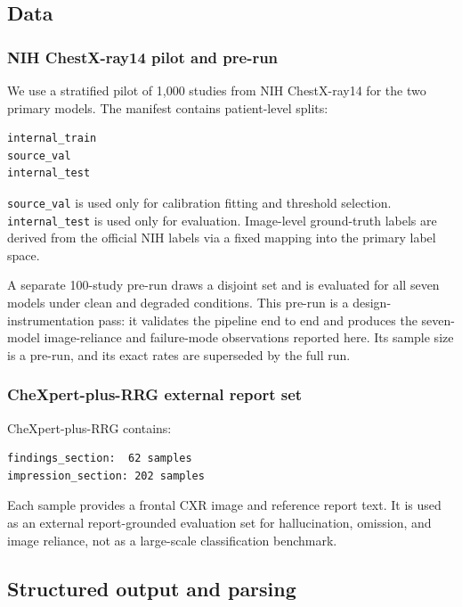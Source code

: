 \subsection{Data}

\subsubsection{NIH ChestX-ray14 pilot and pre-run}

We use a stratified pilot of 1,000 studies from NIH ChestX-ray14 for the two primary models. The manifest contains patient-level splits:

\begin{verbatim}
internal_train
source_val
internal_test
\end{verbatim}

\texttt{source\_val} is used only for calibration fitting and threshold selection. \texttt{internal\_test} is used only for evaluation. Image-level ground-truth labels are derived from the official NIH labels via a fixed mapping into the primary label space.

A separate 100-study pre-run draws a disjoint set and is evaluated for all seven models under clean and degraded conditions. This pre-run is a design-instrumentation pass: it validates the pipeline end to end and produces the seven-model image-reliance and failure-mode observations reported here. Its sample size is a pre-run, and its exact rates are superseded by the full run.

\subsubsection{CheXpert-plus-RRG external report set}

CheXpert-plus-RRG contains:

\begin{verbatim}
findings_section:  62 samples
impression_section: 202 samples
\end{verbatim}

Each sample provides a frontal CXR image and reference report text. It is used as an external report-grounded evaluation set for hallucination, omission, and image reliance, not as a large-scale classification benchmark.

\subsection{Structured output and parsing}

